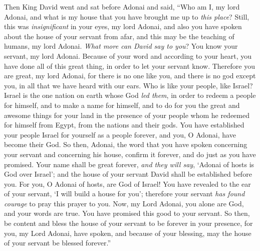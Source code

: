 \begin{biblechapter}
\verse Then King David went and sat before Adonai and said, “Who am I, my lord Adonai, and what is my house that you have brought me up to \textit{this place}?
\verse Still, this was \textit{insignificant} in your eyes, my lord Adonai, and also you have spoken about the house of your servant from afar, and this may be the teaching of humans, my lord Adonai.
\verse \textit{What more can David say to you}? You know your servant, my lord Adonai.
\verse Because of your word and according to your heart, you have done all of this great thing, in order to let your servant know.
\verse Therefore you are great, my lord Adonai, for there is no one like you, and there is no god except you, in all that we have heard with our ears.
\verse Who is like your people, like Israel? Israel is the one nation on earth whose God \textit{led them}, in order to redeem a people for himself, and to make a name for himself, and to do for you the great and awesome things for your land in the presence of your people whom he redeemed for himself from Egypt, from the nations and their gods.
\verse You have established your people Israel for yourself as a people forever, and you, O Adonai, have become their God.
\verse So then, Adonai, the word that you have spoken concerning your servant and concerning his house, confirm it forever, and do just as you have promised.
\verse Your name shall be great forever, \textit{and they will say}, ‘Adonai of hosts is God over Israel’; and the house of your servant David shall be established before you.
\verse For you, O Adonai of hosts, are God of Israel! You have revealed to the ear of your servant, ‘I will build a house for you’; therefore your servant \textit{has found courage} to pray this prayer to you.
\verse Now, my Lord Adonai, you alone are God, and your words are true. You have promised this good to your servant.
\verse So then, be content and bless the house of your servant to be forever in your presence, for you, my Lord Adonai, have spoken, and because of your blessing, may the house of your servant be blessed forever.”
\end{biblechapter}

